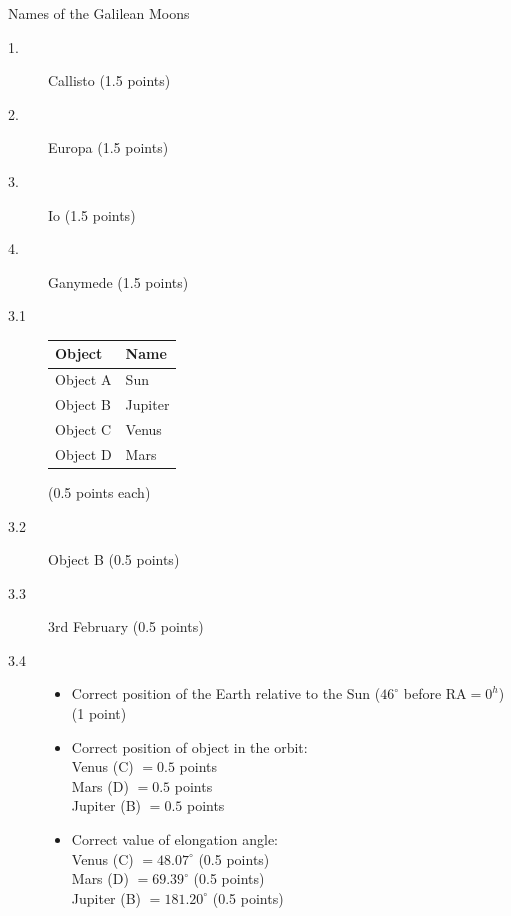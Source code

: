 Names of the Galilean Moons

\begin{description}
\item[1.] Callisto \hfill(1.5 points)
\item[2.] Europa \hfill(1.5 points)
\item[3.] Io \hfill(1.5 points)
\item[4.] Ganymede \hfill(1.5 points)
\end{description}

\begin{description}
\item[3.1]
  \begin{center}
    \begin{tabular}{ll}
      Object   & Name    \\
      \hline
      Object A & Sun     \\
      Object B & Jupiter \\
      Object C & Venus   \\
      Object D & Mars    \\
    \end{tabular}
  \end{center}
  \hfill(0.5 points each)

\item[3.2] Object B \hfill(0.5 points)

\item[3.3] 3rd February \hfill(0.5 points)

\item[3.4]

  \begin{itemize}
  \item Correct position of the Earth relative to the Sun
    ($46^\circ$ before RA${}=0^h$) \hfill(1 point)
  \item Correct position of object in the orbit:\\
    Venus (C) ${}=0.5$ points\\
    Mars (D) ${}=0.5$ points\\
    Jupiter (B) ${}=0.5$ points
  \item Correct value of elongation angle:\\
    Venus (C) ${}=48.07^\circ$ \hfill(0.5 points)\\
    Mars (D) ${}=69.39^\circ$ \hfill(0.5 points)\\
    Jupiter (B) ${}=181.20^\circ$ %
    \hfill(0.5 points)
  \end{itemize}
\end{description}

